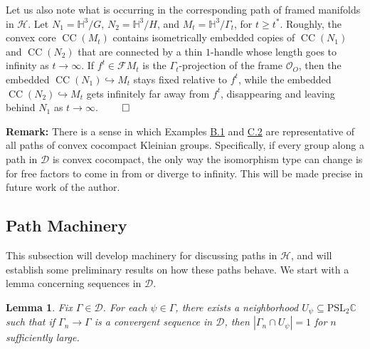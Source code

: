 \documentclass[11pt,leqno]{article}
\DeclareMathOperator{\CC}{CC}
\newtheorem{lemma}{Lemma}
\theoremstyle{introdef}
\numberwithin{lemma}{section}
\theoremstyle{definition}
\newcommand{\C}{\mathbb{C}}
\begin{document}
Let us also note what is occurring in the corresponding path of framed manifolds in $\mathcal{H}$. Let $N_1=\mathbb{H}^3/G$, $N_2=\mathbb{H}^3/H$, and $M_t=\mathbb{H}^3/\Gamma_t$, for $t\geq t^*$. Roughly, the convex core $\CC(M_t)$ contains isometrically embedded copies of $\CC(N_1)$ and $\CC(N_2)$ that are connected by a thin $1$-handle whose length goes to infinity as $t\rightarrow\infty$. If $f^t\in\mathcal{F}M_t$ is the $\Gamma_t$-projection of the frame $\mathcal{O}_O$, then the embedded $\CC(N_1)\hookrightarrow M_t$ stays fixed relative to $f^t$, while the embedded $\CC(N_2)\hookrightarrow M_t$ gets infinitely far away from $f^t$, disappearing and leaving behind $N_1$ as $t\rightarrow\infty$. $\qed$\par

\textbf{Remark:} There is a sense in which Examples \hyperlink{Ex-QCDef}{B.1} and \hyperlink{Ex-CCProd}{C.2} are representative of all paths of convex cocompact Kleinian groups. Specifically, if every group along a path in $\mathcal{D}$ is convex cocompact, the only way the isomorphism type can change is for free factors to come in from or diverge to infinity. This will be made precise in future work of the author.



\subsection{Path Machinery}
\label{subsec-PathConstraints}

This subsection will develop machinery for discussing paths in $\mathcal{H}$, and will establish some preliminary results on how these paths behave. We start with a lemma concerning sequences in $\mathcal{D}$.

\begin{lemma}
    \label{Unbhd}
    Fix $\Gamma\in\mathcal{D}$. For each $\psi\in\Gamma$, there exists a neighborhood $U_\psi\subseteq\mathrm{PSL}_2\C$ such that if  $\Gamma_n\rightarrow\Gamma$ is a convergent sequence in $\mathcal{D}$, then $|\Gamma_n\cap U_\psi|=1$ for $n$ sufficiently large.
\end{lemma}
\end{document}
